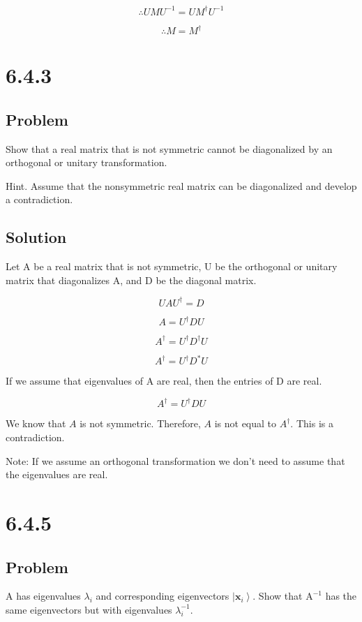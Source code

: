 \documentclass[12pt]{article}
\begin{document}
\[
    \therefore U M U^{-1} = U M^\dagger U^{-1}
\]

\[
    \therefore M = M^\dagger
\]

\newpage
\section{6.4.3}

\subsection{Problem}

Show that a real matrix that is not symmetric cannot be diagonalized by an orthogonal or unitary transformation.

Hint. Assume that the nonsymmetric real matrix can be diagonalized and develop a contradiction.

\subsection{Solution}

Let A be a real matrix that is not symmetric, U be the orthogonal or unitary matrix that diagonalizes A, and D be the diagonal matrix.

\[
    U A U^\dagger = D
\]

\[
    A = U^\dagger D U
\]

\[
    A^\dagger = U^\dagger D^\dagger U
\]

\[
    A^\dagger = U^\dagger D^* U
\]

If we assume that eigenvalues of A are real, then the entries of D are real.

\[
    A^\dagger = U^\dagger D U
\]

We know that \(A\) is not symmetric. Therefore, \(A\) is not equal to \(A^\dagger \). This is a contradiction.

Note: If we assume an orthogonal transformation we don't need to assume that the eigenvalues are real.

\newpage
\section{6.4.5}

\subsection{Problem}

A has eigenvalues \(\lambda_i\) and corresponding eigenvectors \(\left|\mathbf{x}_i\right\rangle \). Show that \(\mathrm{A}^{-1}\) has the same eigenvectors but with eigenvalues \(\lambda_i^{-1}\).
\end{document}
